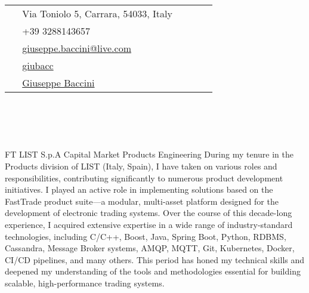 \documentclass[10pt]{article} %
\begin{document}
\begin{paracol}{2}
\parbox[top][0.12\textheight][c]{\linewidth}{ %
	\vspace{-0.04\textheight} %
	\colorbox{shade}{ %
		\begin{supertabular}{p{0.05\linewidth}|p{0.775\linewidth}} %
			\raisebox{-1pt}{\faHome} & Via Toniolo 5, Carrara, 54033, Italy \\ %
			\raisebox{-1pt}{\faPhone} & +39 3288143657 \\ %
			\raisebox{0pt}{\small\faEnvelope} & \href{mailto:giuseppe.baccini@live.com}{giuseppe.baccini@live.com} \\ %
			\raisebox{-1pt}{\faGithub} & \href{https://github.com/giubacc}{giubacc} \\ %
			\raisebox{-1pt}{\faLinkedinSquare} & \href{https://www.linkedin.com/in/giuseppe-baccini-0288687}{Giuseppe Baccini} \\ %
		\end{supertabular}
	}
}
\\
\\
\\
\\
{FT}
{LIST S.p.A} %
{Capital Market Products}
{Engineering}
{During my tenure in the Products division of LIST (Italy, Spain), I have taken on various roles and
responsibilities, contributing significantly to numerous product development initiatives.
I played an active role in implementing solutions based on the FastTrade product suite—a modular,
multi-asset platform designed for the development of electronic trading systems.
Over the course of this decade-long experience, I acquired extensive expertise in a wide range of
industry-standard technologies, including C/C++, Boost, Java, Spring Boot, Python, RDBMS, Cassandra,
Message Broker systems, AMQP, MQTT, Git, Kubernetes, Docker, CI/CD pipelines, and many others.
This period has honed my technical skills and deepened my understanding of the tools and methodologies
essential for building scalable, high-performance trading systems.}


\end{paracol}
\end{document}
